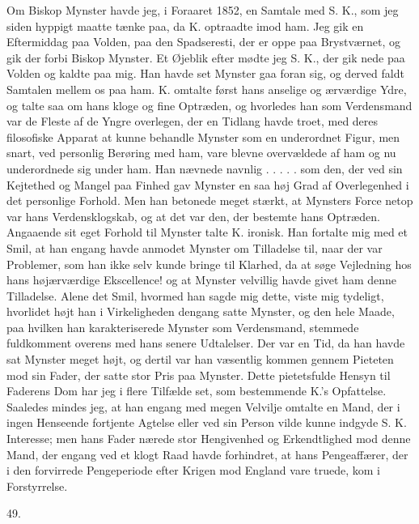 \documentclass[12pt,a4paper,openany]{book}
\newcommand{\secnum}[1]{\par\begin{center}#1\end{center}\par\nobreak}
\newcommand{\opage}[1]{\marginnote{\footnotesize\textit{[#1]}}}
\begin{document}
Om Biskop Mynster havde jeg, i Foraaret 1852, en Samtale med S. K., som jeg
siden hyppigt maatte tænke paa, da K. optraadte imod ham. Jeg gik en
Eftermiddag paa Volden, paa den Spadseresti, der er oppe paa Brystværnet, og
gik der forbi Biskop Mynster. Et Øjeblik efter mødte jeg S. K., der gik nede
paa Volden og kaldte paa mig. Han havde set Mynster gaa foran sig, og derved
faldt Samtalen mellem os paa ham. K. omtalte først hans anselige og
ærværdige Ydre, og talte saa om hans kloge og fine Optræden, og hvorledes han
som Verdensmand var de Fleste af de Yngre overlegen, der en Tidlang havde
troet, med deres filosofiske Apparat at kunne behandle Mynster som en
underordnet Figur, men snart, ved personlig Berøring med ham, vare blevne
overvældede af ham og nu underordnede sig under ham. Han nævnede navnlig
. . . . . som den, der ved sin Kejtethed og Mangel paa Finhed gav Mynster en
saa høj Grad af
\opage{372}Overlegenhed i det personlige Forhold. Men han betonede meget stærkt,
at Mynsters Force netop var hans Verdensklogskab, og at det var den, der
bestemte hans Optræden. Angaaende sit eget Forhold til Mynster talte K.
ironisk. Han fortalte mig med et Smil, at han engang havde anmodet Mynster om
Tilladelse til, naar der var Problemer, som han ikke selv kunde bringe til
Klarhed, da at søge Vejledning hos hans højærværdige Ekscellence! og at
Mynster velvillig havde givet ham denne Tilladelse. Alene det Smil, hvormed
han sagde mig dette, viste mig tydeligt, hvorlidet højt han i Virkeligheden
dengang satte Mynster, og den hele Maade, paa hvilken han karakteriserede
Mynster som Verdensmand, stemmede fuldkomment overens med hans senere
Udtalelser. Der var en Tid, da han havde sat Mynster meget højt, og dertil var
han væsentlig kommen gennem Pieteten mod sin Fader, der satte stor Pris paa
Mynster. Dette pietetsfulde Hensyn til Faderens Dom har jeg i flere Tilfælde
set, som bestemmende K.’s Opfattelse. Saaledes mindes jeg, at han engang med
megen Velvilje omtalte en Mand, der i ingen Henseende fortjente Agtelse eller
ved sin Person vilde kunne indgyde S. K. Interesse; men hans Fader nærede stor
Hengivenhed og Erkendtlighed mod denne Mand, der engang ved et klogt Raad havde
forhindret, at hans Pengeaffærer, der i den forvirrede Pengeperiode efter
Krigen mod England vare truede, kom i Forstyrrelse.

\secnum{49.}
\end{document}
